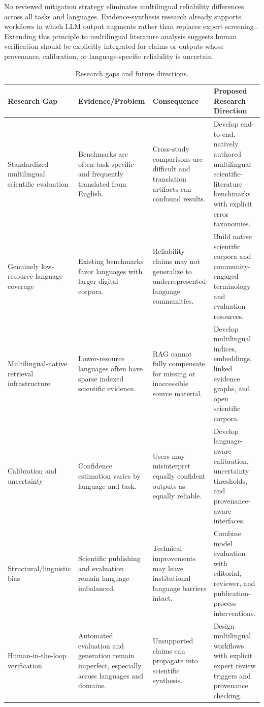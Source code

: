 \documentclass[acmsmall,nonacm]{acmart}
\begin{document}
No reviewed mitigation strategy eliminates multilingual reliability differences across all tasks and languages. Evidence-synthesis research already supports workflows in which LLM output augments rather than replaces expert screening \cite{Scherbakov2025}. Extending this principle to multilingual literature analysis suggests human verification should be explicitly integrated for claims or outputs whose provenance, calibration, or language-specific reliability is uncertain.

\begin{table}[t]
\caption{Research gaps and future directions.}
\label{tab:gaps}
\scriptsize
\renewcommand{\arraystretch}{0.92}
\begin{tabularx}{\textwidth}{p{1.8cm}Y Y Y}
\toprule
Research Gap & Evidence/Problem & Consequence & Proposed Research Direction \\
\midrule
Standardized multilingual scientific evaluation & Benchmarks are often task-specific and frequently translated from English. & Cross-study comparisons are difficult and translation artifacts can confound results. & Develop end-to-end, natively authored multilingual scientific-literature benchmarks with explicit error taxonomies. \\
Genuinely low-resource language coverage & Existing benchmarks favor languages with larger digital corpora. & Reliability claims may not generalize to underrepresented language communities. & Build native scientific corpora and community-engaged terminology and evaluation resources. \\
Multilingual-native retrieval infrastructure & Lower-resource languages often have sparse indexed scientific evidence. & RAG cannot fully compensate for missing or inaccessible source material. & Develop multilingual indices, embeddings, linked evidence graphs, and open scientific corpora. \\
Calibration and uncertainty & Confidence estimation varies by language and task. & Users may misinterpret equally confident outputs as equally reliable. & Develop language-aware calibration, uncertainty thresholds, and provenance-aware interfaces. \\
Structural/linguistic bias & Scientific publishing and evaluation remain language-imbalanced. & Technical improvements may leave institutional language barriers intact. & Combine model evaluation with editorial, reviewer, and publication-process interventions. \\
Human-in-the-loop verification & Automated evaluation and generation remain imperfect, especially across languages and domains. & Unsupported claims can propagate into scientific synthesis. & Design multilingual workflows with explicit expert review triggers and provenance checking. \\
\bottomrule
\end{tabularx}
\end{table}
\end{document}
